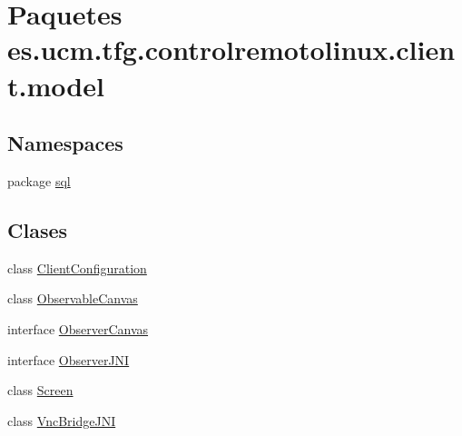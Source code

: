\hypertarget{namespacees_1_1ucm_1_1tfg_1_1controlremotolinux_1_1client_1_1model}{\section{Paquetes es.\-ucm.\-tfg.\-controlremotolinux.\-client.\-model}
\label{namespacees_1_1ucm_1_1tfg_1_1controlremotolinux_1_1client_1_1model}
}
\subsection*{Namespaces}
\begin{DoxyCompactItemize}
\item 
package \hyperlink{namespacees_1_1ucm_1_1tfg_1_1controlremotolinux_1_1client_1_1model_1_1sql}{sql}
\end{DoxyCompactItemize}
\subsection*{Clases}
\begin{DoxyCompactItemize}
\item 
class \hyperlink{classes_1_1ucm_1_1tfg_1_1controlremotolinux_1_1client_1_1model_1_1ClientConfiguration}{Client\-Configuration}
\item 
class \hyperlink{classes_1_1ucm_1_1tfg_1_1controlremotolinux_1_1client_1_1model_1_1ObservableCanvas}{Observable\-Canvas}
\item 
interface \hyperlink{interfacees_1_1ucm_1_1tfg_1_1controlremotolinux_1_1client_1_1model_1_1ObserverCanvas}{Observer\-Canvas}
\item 
interface \hyperlink{interfacees_1_1ucm_1_1tfg_1_1controlremotolinux_1_1client_1_1model_1_1ObserverJNI}{Observer\-J\-N\-I}
\item 
class \hyperlink{classes_1_1ucm_1_1tfg_1_1controlremotolinux_1_1client_1_1model_1_1Screen}{Screen}
\item 
class \hyperlink{classes_1_1ucm_1_1tfg_1_1controlremotolinux_1_1client_1_1model_1_1VncBridgeJNI}{Vnc\-Bridge\-J\-N\-I}
\end{DoxyCompactItemize}
